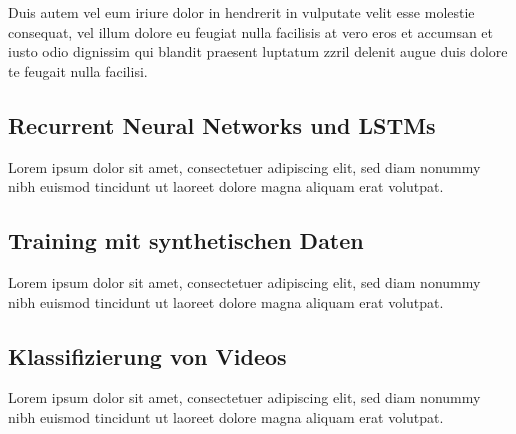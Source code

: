 Duis autem vel eum iriure dolor in hendrerit in vulputate velit esse molestie consequat, vel illum dolore eu feugiat nulla facilisis at vero eros et accumsan et iusto odio dignissim qui blandit praesent luptatum zzril delenit augue duis dolore te feugait nulla facilisi. 


\subsection{Recurrent Neural Networks und LSTMs}
\label{grundlagen_nn_rnn}

Lorem ipsum dolor sit amet, consectetuer adipiscing elit, sed diam nonummy nibh euismod tincidunt ut laoreet dolore magna aliquam erat volutpat. 


\subsection{Training mit synthetischen Daten}
\label{grundlagen_nn_synthetisch}

Lorem ipsum dolor sit amet, consectetuer adipiscing elit, sed diam nonummy nibh euismod tincidunt ut laoreet dolore magna aliquam erat volutpat. 


\subsection{Klassifizierung von Videos}
\label{grundlagen_nn_video}

Lorem ipsum dolor sit amet, consectetuer adipiscing elit, sed diam nonummy nibh euismod tincidunt ut laoreet dolore magna aliquam erat volutpat. 


